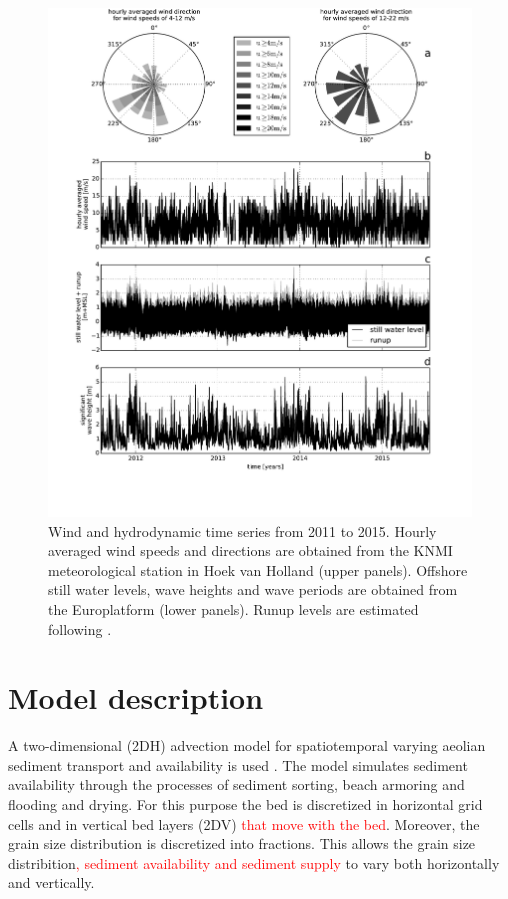 \begin{figure}
  \centering
  \includegraphics[width=\columnwidth]{../Figures/boundaryconditions}
  \caption{Wind and hydrodynamic time series from 2011 to 2015. Hourly
    averaged wind speeds and directions are obtained from the KNMI
    meteorological station in Hoek van Holland (upper
    panels). Offshore still water levels, wave heights and wave
    periods are obtained from the Europlatform (lower panels). Runup
    levels are estimated following \citet{Stockdon2006}.}
  \label{fig:boundaryconditions}
\end{figure}

\section{Model description}

A two-dimensional (2DH) advection model for spatiotemporal varying
aeolian sediment transport and availability is used
\citep{Hoonhout2016}. The model simulates sediment availability
through the processes of sediment sorting, beach armoring and flooding
and drying. For this purpose the bed is discretized in horizontal grid
cells and in vertical bed layers (2DV) \textcolor{red}{that move with
  the bed}. Moreover, the grain size distribution is discretized into
fractions. This allows the grain size distribition\textcolor{red}{,
  sediment availability and sediment supply} to vary both horizontally
and vertically.

